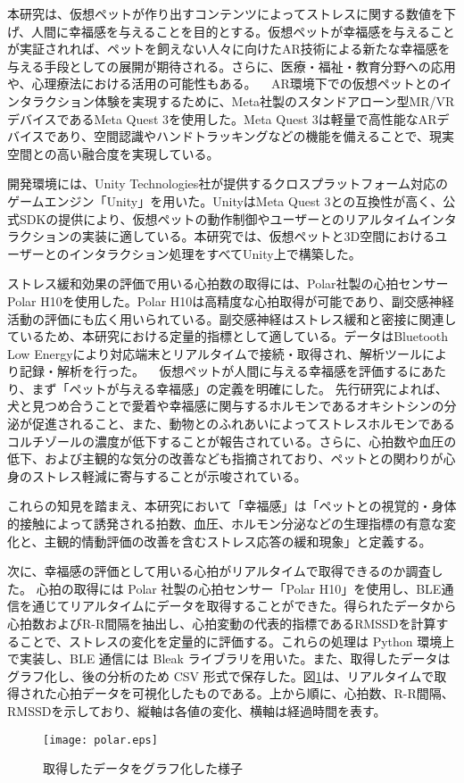 \documentclass[a4j]{ltjsarticle}
\newcounter{seccnt}
\newcommand{\usection}[1]{\ \newline{\bf\underline{\theseccnt\stepcounter{seccnt}. #1}\hspace{10pt}}}
\begin{document}
本研究は、仮想ペットが作り出すコンテンツによってストレスに関する数値を下げ、人間に幸福感を与えることを目的とする。仮想ペットが幸福感を与えることが実証されれば、ペットを飼えない人々に向けたAR技術による新たな幸福感を与える手段としての展開が期待される。さらに、医療・福祉・教育分野への応用や、心理療法における活用の可能性もある。
\usection{関連技術}
AR環境下での仮想ペットとのインタラクション体験を実現するために、Meta社製のスタンドアローン型MR/VRデバイスであるMeta Quest 3を使用した。Meta Quest 3は軽量で高性能なARデバイスであり、空間認識やハンドトラッキングなどの機能を備えることで、現実空間との高い融合度を実現している。

開発環境には、Unity Technologies社が提供するクロスプラットフォーム対応のゲームエンジン「Unity」を用いた。UnityはMeta Quest 3との互換性が高く、公式SDKの提供により、仮想ペットの動作制御やユーザーとのリアルタイムインタラクションの実装に適している。本研究では、仮想ペットと3D空間におけるユーザーとのインタラクション処理をすべてUnity上で構築した。

ストレス緩和効果の評価で用いる心拍数の取得には、Polar社製の心拍センサーPolar H10を使用した。Polar H10は高精度な心拍取得が可能であり、副交感神経活動の評価にも広く用いられている。副交感神経はストレス緩和と密接に関連しているため、本研究における定量的指標として適している。データはBluetooth Low Energyにより対応端末とリアルタイムで接続・取得され、解析ツールにより記録・解析を行った。
\usection{研究の経緯}
仮想ペットが人間に与える幸福感を評価するにあたり、まず「ペットが与える幸福感」の定義を明確にした。
先行研究によれば、犬と見つめ合うことで愛着や幸福感に関与するホルモンであるオキシトシンの分泌が促進されること\cite{1}、また、動物とのふれあいによってストレスホルモンであるコルチゾールの濃度が低下すること\cite{2}が報告されている。さらに、心拍数や血圧の低下\cite{3}、および主観的な気分の改善なども指摘されており、ペットとの関わりが心身のストレス軽減に寄与することが示唆されている。

これらの知見を踏まえ、本研究において「幸福感」は「ペットとの視覚的・身体的接触によって誘発される拍数、血圧、ホルモン分泌などの生理指標の有意な変化と、主観的情動評価の改善を含むストレス応答の緩和現象」と定義する。

次に、幸福感の評価として用いる心拍がリアルタイムで取得できるのか調査した。
心拍の取得には Polar 社製の心拍センサー「Polar H10」を使用し、BLE通信を通じてリアルタイムにデータを取得することができた。得られたデータから心拍数およびR-R間隔を抽出し、心拍変動の代表的指標であるRMSSDを計算することで、ストレスの変化を定量的に評価する。これらの処理は Python 環境上で実装し、BLE 通信には Bleak ライブラリを用いた。また、取得したデータはグラフ化し、後の分析のため CSV 形式で保存した。図\ref{fig:polar}は、リアルタイムで取得された心拍データを可視化したものである。上から順に、心拍数、R-R間隔、RMSSDを示しており、縦軸は各値の変化、横軸は経過時間を表す。
\begin{figure}[b]
  \centering
  \texttt{[image: polar.eps]}
  \caption{取得したデータをグラフ化した様子}
  \label{fig:polar}
\end{figure}
\end{document}
